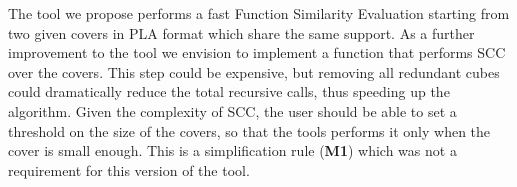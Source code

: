 \documentclass{acm_proc_article-sp}
\begin{document}
The tool we propose performs a fast Function Similarity Evaluation starting
from two given covers in PLA format which share the same support.
As a further improvement to the tool we envision to implement a function
that performs SCC over the covers. This step could be expensive, but
removing all redundant cubes could dramatically reduce the total
recursive calls, thus speeding up the algorithm. Given the complexity
of SCC, the user should be able to set a threshold on the size of the
covers, so that the tools performs it only when the cover is small
enough. This is a simplification rule ({\bf M1}) which was not a
requirement for this version of the tool.

%
%
\end{document}

